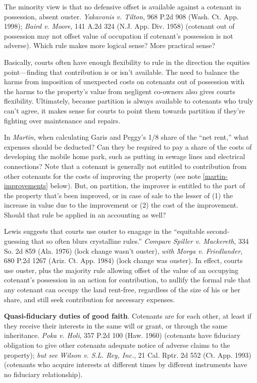 The minority view is that no defensive offset is available against a cotenant in
possession, absent ouster. \emph{Yakavonis v. Tilton}, 968 P.2d 908 (Wash. Ct.
App. 1998); \emph{Baird v. Moore}, 141 A.2d 324 (N.J. App. Div. 1958) (cotenant
out of possession may not offset value of occupation if cotenant's possession is
not adverse). Which rule makes more logical sense? More practical sense?


Basically, courts often have enough flexibility to rule in the direction the
equities point---finding that contribution is or isn't available. The need to
balance the harms from imposition of unexpected costs on cotenants out of
possession with the harms to the property's value from negligent co-owners also
gives courts flexibility. Ultimately, because partition is always available to
cotenants who truly can't agree, it makes sense for courts to point them
towards partition if they're fighting over maintenance and repairs.


In \textit{Martin}, when calculating Garis and Peggy's 1/8
share of the ``net rent,'' what expenses should be deducted? Can they be
required to pay a share of the costs of developing the mobile home park, such
as putting in sewage lines and electrical connections? Note that a cotenant is
generally not entitled to contribution from other cotenants for the costs of
improving the property (see note \ref{martin-improvements} below). But, on
partition, the improver is entitled to the part of the property that's been
improved, or in case of sale to the lesser of (1) the increase in value due to
the improvement or (2) the cost of the improvement. Should that rule be
applied in an accounting as well?

Lewis suggests that courts use ouster to enagage in the ``equitable
second-guessing that so often blurs crystalline rules.'' \emph{Compare}
\emph{Spiller v. Mackereth}, 334 So. 2d 859 (Ala. 1976) (lock change wasn't
ouster), \emph{with} \emph{Morga v. Friedlander}, 680 P.2d 1267 (Ariz. Ct. App.
1984) (lock change was ouster). In effect, courts use ouster, plus the majority
rule allowing offset of the value of an occupying cotenant's possession in an
action for contribution, to nullify the formal rule that any cotenant can occupy
the land rent-free, regardless of the size of his or her share, and still seek
contribution for necessary expenses.


\item \textbf{Quasi-fiduciary duties of good faith}. Cotenants are
for each other, at least if they receive their interests in the same will or
grant, or through the same inheritance. \emph{Poka v. Holi}, 357 P.2d 100 (Haw.
1960) (cotenants have fiduciary obligation to give other cotenants adequate
notice of adverse claims to the property); \emph{but see} \emph{Wilson v. S.L.
Rey, Inc.}, 21 Cal. Rptr. 2d 552 (Ct. App. 1993) (cotenants who acquire
interests at different times by different instruments have no fiduciary
relationship).


